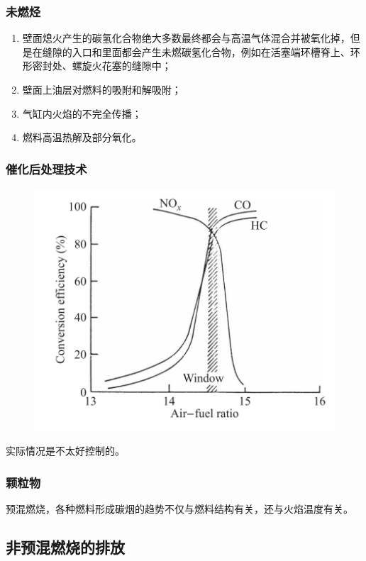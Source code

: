 \subsubsection{未燃烃}
\begin{enumerate}
    \item 壁面熄火产生的碳氢化合物绝大多数最终都会与高温气体混合并被氧化掉，但是在缝隙的入口和里面都会产生未燃碳氢化合物，例如在活塞端环槽脊上、环形密封处、螺旋火花塞的缝隙中；
    \item 壁面上油层对燃料的吸附和解吸附；
    \item 气缸内火焰的不完全传播；
    \item 燃料高温热解及部分氧化。
\end{enumerate}

\subsubsection{催化后处理技术}
\begin{figure}[H]
    \centering
    \includegraphics[width=.3\textwidth]{img/three-way.png}
\end{figure}

实际情况是不太好控制的。

\subsubsection{颗粒物}
预混燃烧，各种燃料形成碳烟的趋势不仅与燃料结构有关，还与火焰温度有关。

\subsection{非预混燃烧的排放}


